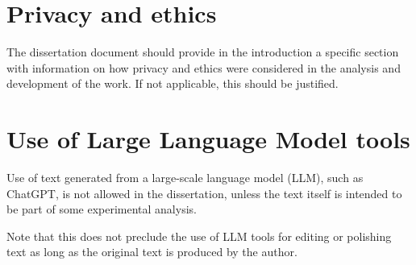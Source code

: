 \section{Privacy and ethics}
The dissertation document should provide in the introduction a specific section with information on how privacy and ethics were considered in the analysis and development of the work. If not applicable, this should be justified.

\section{Use of Large Language Model tools}
Use of text generated from a large-scale language model (LLM), such as ChatGPT, is not allowed in the dissertation, unless the text itself is intended to be part of some experimental analysis.

Note that this does not preclude the use of LLM tools for editing or polishing text as long as the original text is produced by the author.

